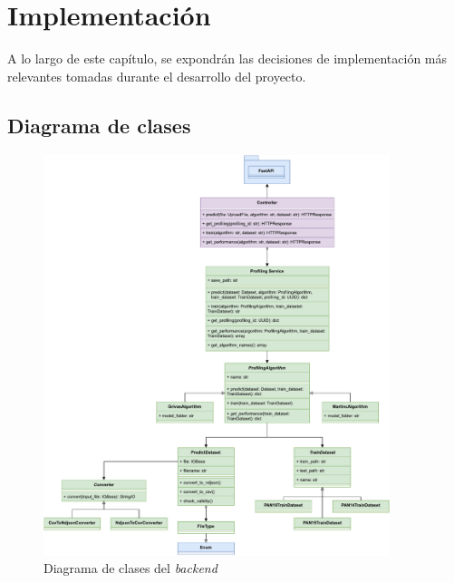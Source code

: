 \chapter{Implementación}
\label{chap:implementacion}

A lo largo de este capítulo, se expondrán las decisiones de implementación más relevantes tomadas durante el desarrollo del proyecto.

\section{Diagrama de clases}

\bigskip
\begin{figure}[H]
	\centering
	\includegraphics[width=0.9\textwidth]{diagramas/clases.pdf}
	\caption{Diagrama de clases del \textit{backend}}
	\label{fig:implementacion_clases}
\end{figure}